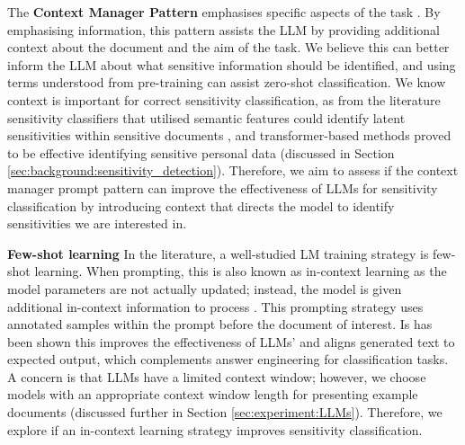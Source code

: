The \textbf{Context Manager Pattern} emphasises specific aspects of the task \cite{white2023prompt}. By emphasising information, this pattern assists the LLM by providing additional context about the document and the aim of the task. We believe this can better inform the LLM about what sensitive information should be identified, and using terms understood from pre-training can assist zero-shot classification. We know context is important for correct sensitivity classification, as from the literature sensitivity classifiers that utilised semantic features could identify latent sensitivities within sensitive documents \cite{mcdonald2017enhancing}, and transformer-based methods proved to be effective identifying sensitive personal data \cite{gambarelli2023your} (discussed in Section \ref{sec:background:sensitivity_detection}). Therefore, we aim to assess if the context manager prompt pattern can improve the effectiveness of LLMs for sensitivity classification by introducing context that directs the model to identify sensitivities we are interested in.

\textbf{Few-shot learning}
In the literature, a well-studied LM training strategy is few-shot learning. When prompting, this is also known as in-context learning as the model parameters are not actually updated; instead, the model is given additional in-context information to process \cite{gao2020making, brown2020language}. This prompting strategy uses annotated samples within the prompt before the document of interest. Is has been shown this improves the effectiveness of LLMs' and aligns generated text to expected output, which complements answer engineering for classification tasks. A concern is that LLMs have a limited context window; however, we choose models with an appropriate context window length for presenting example documents (discussed further in Section \ref{sec:experiment:LLMs}). Therefore, we explore if an in-context learning strategy improves sensitivity classification.

